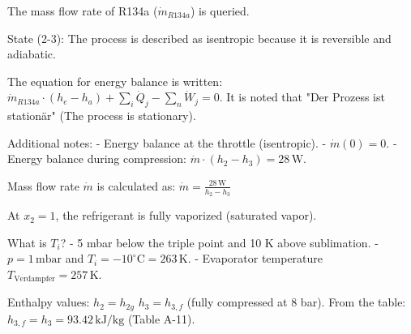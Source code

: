 The mass flow rate of R134a (\( \dot{m}_{R134a} \)) is queried.  

State (2-3): The process is described as isentropic because it is reversible and adiabatic.  

The equation for energy balance is written:  
\( \dot{m}_{R134a} \cdot (h_e - h_a) + \sum_i \dot{Q}_j - \sum_n \dot{W}_j = 0 \).  
It is noted that "Der Prozess ist stationär" (The process is stationary).  

Additional notes:  
- Energy balance at the throttle (isentropic).  
- \( \dot{m}(0) = 0 \).  
- Energy balance during compression:  
  \( \dot{m} \cdot (h_2 - h_3) = 28 \, \text{W} \).

Mass flow rate \( \dot{m} \) is calculated as:  
\( \dot{m} = \frac{28 \, \text{W}}{h_2 - h_3} \)  

At \( x_2 = 1 \), the refrigerant is fully vaporized (saturated vapor).  

What is \( T_i \)?  
- 5 mbar below the triple point and 10 K above sublimation.  
- \( p = 1 \, \text{mbar} \) and \( T_i = -10^\circ \text{C} = 263 \, \text{K} \).  
- Evaporator temperature \( T_{\text{Verdampfer}} = 257 \, \text{K} \).  

Enthalpy values:  
\( h_2 = h_{2g} \)  
\( h_3 = h_{3,f} \) (fully compressed at 8 bar).  
From the table: \( h_{3,f} = h_3 = 93.42 \, \text{kJ/kg} \) (Table A-11).